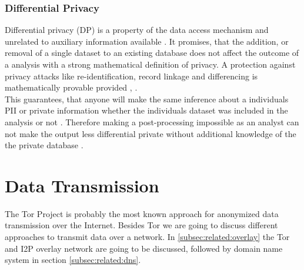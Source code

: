         \subsubsection{Differential Privacy}
            \label{subsec:related:dif_privacy}
            Differential privacy (DP) is a property of the data access mechanism and unrelated to auxiliary information available \cite{dwork_algorithmic_2013}. 
            It promises, that the addition, or removal of a single dataset to an existing database does not affect the outcome of a analysis with a strong mathematical definition of privacy. A protection against privacy attacks like re-identification, record linkage and differencing is mathematically provable provided  \cite{agrawal_differential_2008},  \cite{wood_differential_2018}. \\
            This guarantees, that anyone will make the same inference about a individuals PII or private information whether the individuals dataset was included in the analysis or not \cite{wood_differential_2018}. Therefore making a post-processing impossible as an analyst can not make the output less differential private without additional knowledge of the the private database \cite{nguyen_understanding_2019}.
            
\section{Data Transmission}
    \label{sec:related:data_transmission}
    The Tor Project is probably the most known approach for anonymized data transmission over the Internet. Besides Tor we are going to discuss different approaches to transmit data over a network. In \ref{subsec:related:overlay} the Tor and I2P overlay network are going to be discussed, followed by domain name system in section \ref{subsec:related:dns}. 
        
        
